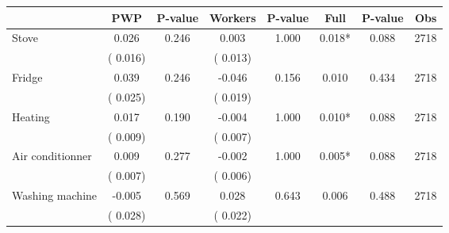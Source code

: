 
\begin{tabular}{l*{7}{c}}\hline&\multicolumn{1}{c}{PWP}&\multicolumn{1}{c}{P-value}&\multicolumn{1}{c}{Workers}&\multicolumn{1}{c}{P-value}&\multicolumn{1}{c}{Full}&\multicolumn{1}{c}{P-value}&\multicolumn{1}{c}{Obs} \\ \hline

 Stove       &              0.026       &        0.246  &              0.003       &        1.000  &              0.018*       &              0.088 &  2718 \\ 
                       &       (       0.016)             &                               &       (       0.013)                     &                               &                                               &                                &                      \\ 

 Fridge       &              0.039       &        0.246  &             -0.046       &        0.156  &              0.010       &              0.434 &  2718 \\ 
                       &       (       0.025)             &                               &       (       0.019)                     &                               &                                               &                                &                      \\ 

 Heating       &              0.017       &        0.190  &             -0.004       &        1.000  &              0.010*       &              0.088 &  2718 \\ 
                       &       (       0.009)             &                               &       (       0.007)                     &                               &                                               &                                &                      \\ 

 Air conditionner       &              0.009       &        0.277  &             -0.002       &        1.000  &              0.005*       &              0.088 &  2718 \\ 
                       &       (       0.007)             &                               &       (       0.006)                     &                               &                                               &                                &                      \\ 

 Washing machine       &             -0.005       &        0.569  &              0.028       &        0.643  &              0.006       &              0.488 &  2718 \\ 
                       &       (       0.028)             &                               &       (       0.022)                     &                               &                                               &                                &                      \\ 


\end{tabular}
